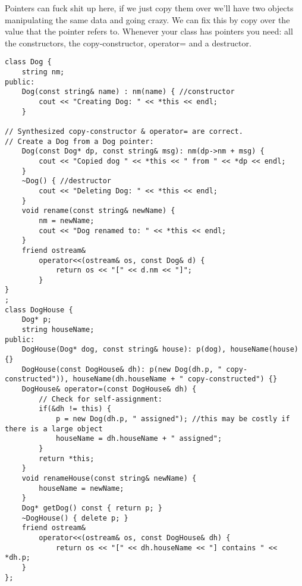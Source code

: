 \documentclass[12pt]{article}
\begin{document}
Pointers can fuck shit up here, if we just copy them over we'll have two objects manipulating the same data and going crazy. We can fix this by copy over the value that the pointer refers to. Whenever your class has pointers you need: all the constructors, the copy-constructor, operator= and a destructor.
\begin{lstlisting}
class Dog {
    string nm;
public:
    Dog(const string& name) : nm(name) { //constructor
        cout << "Creating Dog: " << *this << endl;
    }

// Synthesized copy-constructor & operator= are correct.
// Create a Dog from a Dog pointer:
    Dog(const Dog* dp, const string& msg): nm(dp->nm + msg) {
        cout << "Copied dog " << *this << " from " << *dp << endl;
    }
    ~Dog() { //destructor
        cout << "Deleting Dog: " << *this << endl;
    }
    void rename(const string& newName) {
        nm = newName;
        cout << "Dog renamed to: " << *this << endl;
    }
    friend ostream&
        operator<<(ostream& os, const Dog& d) {
            return os << "[" << d.nm << "]";
        }
}
;
class DogHouse {
    Dog* p;
    string houseName;
public:
    DogHouse(Dog* dog, const string& house): p(dog), houseName(house) {}
    DogHouse(const DogHouse& dh): p(new Dog(dh.p, " copy-constructed")), houseName(dh.houseName + " copy-constructed") {}
    DogHouse& operator=(const DogHouse& dh) {
        // Check for self-assignment:
        if(&dh != this) {
            p = new Dog(dh.p, " assigned"); //this may be costly if there is a large object
            houseName = dh.houseName + " assigned";
        }
        return *this;
    }
    void renameHouse(const string& newName) {
        houseName = newName;
    }
    Dog* getDog() const { return p; }
    ~DogHouse() { delete p; }
    friend ostream&
        operator<<(ostream& os, const DogHouse& dh) {
            return os << "[" << dh.houseName << "] contains " << *dh.p;
    }
};
\end{lstlisting}
\end{document}
